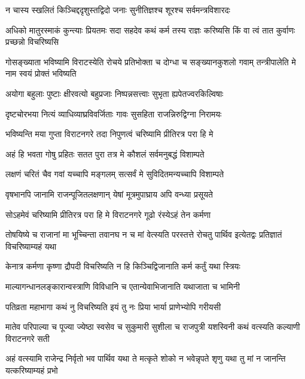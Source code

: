 \twolineshloka
{न चास्य स्खलितं किञ्चिद्ददृशुस्तद्विदो जनाः}
{सुनीतिज्ञश्च शूरश्च सर्वमन्त्रविशारदः}


\threelineshloka
{अधिको मातुरस्माकं कुन्त्याः प्रियतमः सदा}
{सहदेव कथं कर्म तस्य राज्ञः करिष्यसि}
{किं वा त्वं तात कुर्वाणः प्रच्छन्नो विचरिष्यसि}




\threelineshloka
{गोसङ्ख्याता भविष्यामि विराटस्येति रोचये}
{प्रतिभोक्ता च दोग्धा च सङ्ख्यानकुशलो गवाम्}
{तन्त्रीपालेति मे नाम स्वयं प्रोक्तं भविष्यति}


\twolineshloka
{अयोगा बहुलाः पुष्टाः क्षीरवत्यो बहुप्रजाः}
{निष्पन्नसत्त्वाः सुभृता ह्यपेतज्वरकिल्विषाः}


\twolineshloka
{दृष्टचोरभया नित्यं व्याधिव्याघ्रविवर्जिताः}
{गावः सुसहिता राजन्निरुद्विग्ना निरामयः}


\twolineshloka
{भविष्यन्ति मया गुप्ता विराटनगरे तदा}
{निपुणत्वं चरिष्यामि प्रीतिरत्र परा हि मे}


\twolineshloka
{अहं हि भवता गोषु प्रहितः सतत पुरा}
{तत्र मे कौशलं सर्वमनुबद्धं विशाम्पते}


\twolineshloka
{लक्षणं चरितं चैव गवां यच्चापि मङ्गलम्}
{सत्सर्वं मे सुविदितमन्यच्चापि विशाम्पते}


\twolineshloka
{वृषभानपि जानामि राजन्पूजितलक्षणान्}
{येषां मूत्रमुपाघ्राय अपि वन्ध्या प्रसूयते}


\twolineshloka
{सोऽहमेवं चरिष्यामि प्रीतिरत्र परा हि मे}
{विराटनगरे गूढो रंस्येऽहं तेन कर्मणा}


\threelineshloka
{तोषयिष्ये च राजानां मा भूच्चिन्ता तवानघ}
{न च मां वेत्स्यति परस्तत्ते रोचतु पार्थिव}
{इत्येतद्वः प्रतिज्ञातं विचरिष्याम्यहं यथा}




\twolineshloka
{केनात्र कर्मणा कृष्णा द्रौपदी विचरिष्यति}
{न हि किञ्चिद्विजानाति कर्म कर्तुं यथा स्त्रियः}


\twolineshloka
{माल्यागन्धानलङ्कारान्वस्त्राणि विविधानि च}
{एतान्येवाभिजानाति यथाजाता च भामिनी}


\twolineshloka
{पतिव्रता महाभागा कथं नु विचरिष्यति}
{इयं तु नः प्रिया भार्या प्राणेभ्योपि गरीयसी}


\threelineshloka
{मातेव परिपाल्या च पूज्या ज्येष्ठा स्वसेव च}
{सुकुमारी सुशीला च राजपुत्री यशस्विनी}
{कथं वत्स्यति कल्याणी विराटनगरे सती}




\threelineshloka
{अहं वत्स्यामि राजेन्द्र निर्वृतो भव पार्थिव}
{यथा ते मत्कृते शोको न भवेन्नृपते शृणु}
{यथा तु मां न जानन्ति यत्करिष्याम्यहं प्रभो}


